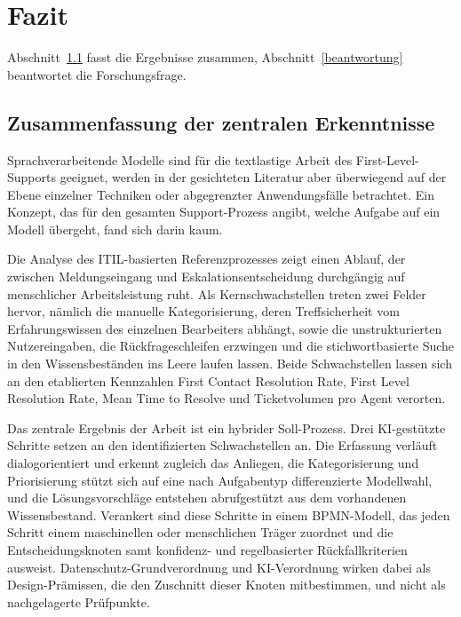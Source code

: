 \section{Fazit}
\label{fazit}

Abschnitt~\ref{zusammenfassung} fasst die Ergebnisse zusammen, Abschnitt~\ref{beantwortung} beantwortet die Forschungsfrage.

\subsection{Zusammenfassung der zentralen Erkenntnisse}
\label{zusammenfassung}

Sprachverarbeitende Modelle sind f\"ur die textlastige Arbeit des First-Level-Supports geeignet, werden in der gesichteten Literatur aber \"uberwiegend auf der Ebene einzelner Techniken oder abgegrenzter Anwendungsf\"alle betrachtet. Ein Konzept, das f\"ur den gesamten Support-Prozess angibt, welche Aufgabe auf ein Modell \"ubergeht, fand sich darin kaum.

Die Analyse des ITIL-basierten Referenzprozesses zeigt einen Ablauf, der zwischen Meldungseingang und Eskalationsentscheidung durchg\"angig auf menschlicher Arbeitsleistung ruht. Als Kernschwachstellen treten zwei Felder hervor, n\"amlich die manuelle Kategorisierung, deren Treffsicherheit vom Erfahrungswissen des einzelnen Bearbeiters abh\"angt, sowie die unstrukturierten Nutzereingaben, die R\"uckfrageschleifen erzwingen und die stichwortbasierte Suche in den Wissensbest\"anden ins Leere laufen lassen. Beide Schwachstellen lassen sich an den etablierten Kennzahlen First Contact Resolution Rate, First Level Resolution Rate, Mean Time to Resolve und Ticketvolumen pro Agent verorten.

Das zentrale Ergebnis der Arbeit ist ein hybrider Soll-Prozess. Drei KI-gest\"utzte Schritte setzen an den identifizierten Schwachstellen an. Die Erfassung verl\"auft dialogorientiert und erkennt zugleich das Anliegen, die Kategorisierung und Priorisierung st\"utzt sich auf eine nach Aufgabentyp differenzierte Modellwahl, und die L\"osungsvorschl\"age entstehen abrufgest\"utzt aus dem vorhandenen Wissensbestand. Verankert sind diese Schritte in einem BPMN-Modell, das jeden Schritt einem maschinellen oder menschlichen Tr\"ager zuordnet und die Entscheidungsknoten samt konfidenz- und regelbasierter R\"uckfallkriterien ausweist. Datenschutz-Grundverordnung und KI-Verordnung wirken dabei als Design-Pr\"amissen, die den Zuschnitt dieser Knoten mitbestimmen, und nicht als nachgelagerte Pr\"ufpunkte.

